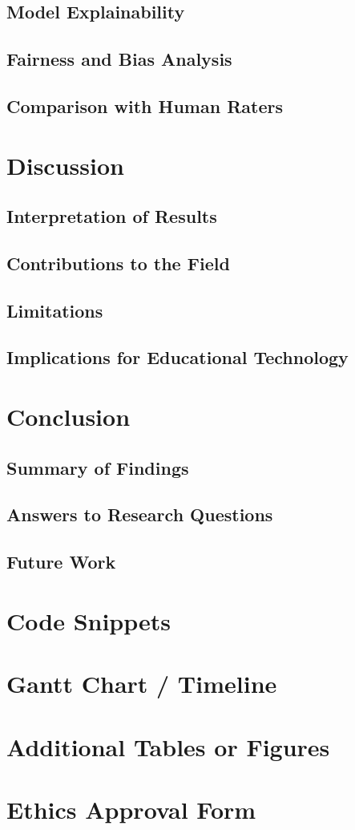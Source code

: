 \documentclass[12pt]{report}
\begin{document}
\section{Model Explainability}
\section{Fairness and Bias Analysis}
\section{Comparison with Human Raters}

\chapter{Discussion}
\section{Interpretation of Results}
\section{Contributions to the Field}
\section{Limitations}
\section{Implications for Educational Technology}

\chapter{Conclusion}
\section{Summary of Findings}
\section{Answers to Research Questions}
\section{Future Work}


\printbibliography


\appendix
\chapter{Code Snippets}
\chapter{Gantt Chart / Timeline}
\chapter{Additional Tables or Figures}
\chapter{Ethics Approval Form}
\end{document}
